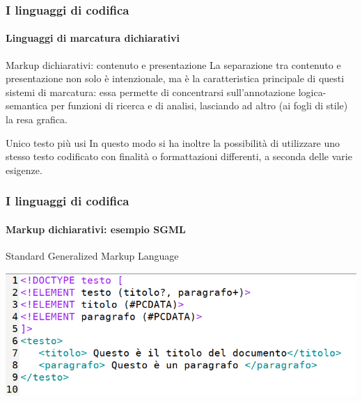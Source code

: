\documentclass{beamer}
\begin{document}
\begin{frame}
	\frametitle{I linguaggi di codifica}
	\framesubtitle{Linguaggi di marcatura dichiarativi}
	\addtocounter{nframe}{1}

	\begin{block}{Markup dichiarativi: contenuto e presentazione}
		La separazione tra contenuto e presentazione non solo è intenzionale, ma è la caratteristica principale di questi sistemi di marcatura: essa permette di concentrarsi sull'annotazione logica-semantica per funzioni di ricerca e di analisi, lasciando ad altro (ai fogli di stile) la resa grafica.
	\end{block}

	\begin{block}{Unico testo più usi}
		In questo modo si ha inoltre la possibilità di utilizzare uno stesso testo codificato con
		finalità o formattazioni differenti, a seconda delle varie esigenze.
	\end{block}

\end{frame}

\begin{frame}
	\frametitle{I linguaggi di codifica}
	\framesubtitle{Markup dichiarativi: esempio SGML}
	\addtocounter{nframe}{1}

	\begin{block}{Standard Generalized Markup Language}
		\begin{center}
			\includegraphics[width=.9\textwidth]{imgs/testo-sgml.png}
		\end{center}
	\end{block}

\end{frame}
\end{document}
